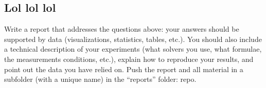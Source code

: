 \documentclass[11pt,a4paper]{article}
\begin{document}
\subsection{Lol lol lol}
Write a report that addresses the questions above: your answers should be
supported by data (visualizations, statistics, tables, etc.). You should also include a
technical description of your experiments (what solvers you use, what formulae, the
measurements conditions, etc.), explain how to reproduce your results, and point out
the data you have relied on. Push the report and all material in a subfolder (with a
unique name) in the “reports” folder:
repo.
\end{document}

